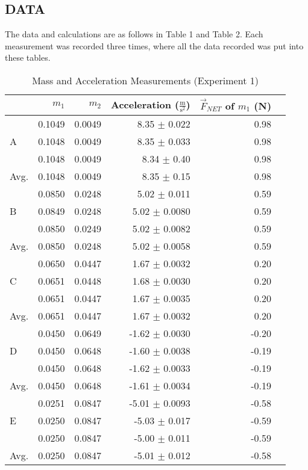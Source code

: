 \documentclass [12pt, letterpaper, twoside] {article}
\begin{document}
\subsection* {DATA}
The data and calculations are as follows in Table 1 and Table 2. Each measurement was recorded three times, where all the data recorded was put into these tables.
\begin {table}[h!]
  \centering
  \begin {tabular}{| l | r | r | r | r | r |}
    \hline\hline
    & \(m_{1}\) & \(m_{2}\) & Acceleration (\(\tfrac{\text{m}}{\text{s}^2}\))& \(\vec{F}_{NET}\) of \(m_{1}\) (N) \\
    \hline
    \multirow{3}{*}{A} & 0.1049 & 0.0049 & 8.35 \(\pm\) 0.022 & 0.98\\
    & 0.1048 & 0.0049 & 8.35 \(\pm\) 0.033 & 0.98 \\ %
    & 0.1048 & 0.0049 & 8.34 \(\pm\) 0.40 & 0.98 \\ %
    \hline
    Avg. & 0.1048 & 0.0049 & 8.35 \(\pm\) 0.15 & 0.98 \\ %
    \hline
    \multirow{3}{*}{B} & 0.0850 & 0.0248 & 5.02 \(\pm\) 0.011 & 0.59 \\ %
    & 0.0849 & 0.0248 & 5.02 \(\pm\) 0.0080 & 0.59 \\ %
    & 0.0850 & 0.0249 & 5.02 \(\pm\) 0.0082 & 0.59 \\ %
    \hline
    Avg. & 0.0850 & 0.0248 & 5.02 \(\pm\) 0.0058 & 0.59 \\ %
    \hline
    \multirow{3}{*}{C} & 0.0650 & 0.0447 & 1.67 \(\pm\) 0.0032 & 0.20 \\ %
    & 0.0651 & 0.0448 & 1.68 \(\pm\) 0.0030 & 0.20 \\ %
    & 0.0651 & 0.0447 & 1.67 \(\pm\) 0.0035 & 0.20 \\ %
    \hline
    Avg. & 0.0651 & 0.0447 & 1.67 \(\pm\) 0.0032 & 0.20 \\ %
    \hline
    \multirow{3}{*}{D} & 0.0450 & 0.0649 & -1.62 \(\pm\) 0.0030 & -0.20 \\ %
    & 0.0450 & 0.0648 &  -1.60 \(\pm\) 0.0038 & -0.19 \\ %
    & 0.0450 & 0.0648 & -1.62 \(\pm\) 0.0033 & -0.19 \\ %
    \hline
    Avg. & 0.0450 & 0.0648 & -1.61 \(\pm\) 0.0034 & -0.19 \\ %
    \hline
    \multirow{3}{*}{E} & 0.0251 & 0.0847 & -5.01 \(\pm\) 0.0093 & -0.58 \\ %
    & 0.0250 & 0.0847 & -5.03 \(\pm\) 0.017 & -0.59 \\ %
    & 0.0250 & 0.0847 & -5.00 \(\pm\) 0.011 & -0.59 \\ %
    \hline
    Avg. & 0.0250 & 0.0847 & -5.01 \(\pm\) 0.012 & -0.58 \\ %
    \hline\hline
  \end {tabular}
  \caption {Mass and Acceleration Measurements (Experiment 1)}
\end {table}
\end{document}
